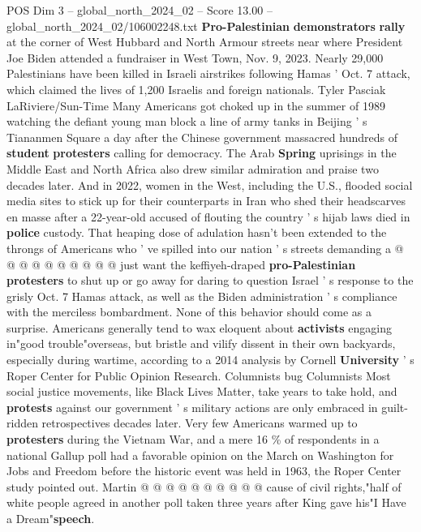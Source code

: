 \begin{textsample}{POS Dim 3 – global\_north\_2024\_02 – Score 13.00 – global\_north\_2024\_02/106002248.txt}  \label{ex:f3_pos_254}
\textbf{Pro-Palestinian} \textbf{demonstrators} \textbf{rally} at the corner of West Hubbard and North Armour streets near where President Joe Biden attended a fundraiser in West Town, Nov. 9, 2023.
Nearly 29,000 Palestinians have been killed in Israeli airstrikes following Hamas ' Oct. 7 attack, which claimed the lives of 1,200 Israelis and foreign nationals.
Tyler Pasciak LaRiviere/Sun-Time Many Americans got choked up in the summer of 1989 watching the defiant young man block a line of army tanks in Beijing ' s Tiananmen Square a day after the Chinese government massacred hundreds of \textbf{student} \textbf{protesters} calling for democracy.
The Arab \textbf{Spring} uprisings in the Middle East and North Africa also drew similar admiration and praise two decades later.
And in 2022, women in the West, including the U.S., flooded social media sites to stick up for their counterparts in Iran who shed their headscarves en masse after a 22-year-old accused of flouting the country ' s hijab laws died in \textbf{police} custody.
That heaping dose of adulation hasn't been extended to the throngs of Americans who ' ve spilled into our nation ' s streets demanding a @ @ @ @ @ @ @ @ @ @ just want the keffiyeh-draped \textbf{pro-Palestinian} \textbf{protesters} to shut up or go away for daring to question Israel ' s response to the grisly Oct. 7 Hamas attack, as well as the Biden administration ' s compliance with the merciless bombardment.
None of this behavior should come as a surprise.
Americans generally tend to wax eloquent about \textbf{activists} engaging in"good trouble"overseas, but bristle and vilify dissent in their own backyards, especially during wartime, according to a 2014 analysis by Cornell \textbf{University} ' s Roper Center for Public Opinion Research.
Columnists bug Columnists Most social justice movements, like Black Lives Matter, take years to take hold, and \textbf{protests} against our government ' s military actions are only embraced in guilt-ridden retrospectives decades later.
Very few Americans warmed up to \textbf{protesters} during the Vietnam War, and a mere 16 \% of respondents in a national Gallup poll had a favorable opinion on the March on Washington for Jobs and Freedom before the historic event was held in 1963, the Roper Center study pointed out.
Martin @ @ @ @ @ @ @ @ @ @ cause of civil rights,"half of white people agreed in another poll taken three years after King gave his"I Have a Dream"\textbf{speech}.

\end{textsample}
